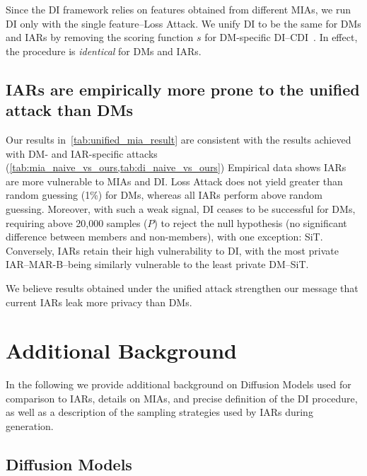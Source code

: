 {Since the DI framework relies on features obtained from different MIAs, we run DI only with the single feature--Loss Attack. We unify DI to be the same for DMs and IARs by removing the scoring function $s$ for DM-specific DI--CDI~\citep{dubinski2024cdicopyrighteddataidentification}. In effect, the procedure is \textit{identical} for DMs and IARs.}

\subsection{IARs are empirically more prone to the unified attack than DMs}

{Our results in~\cref{tab:unified_mia_result} are consistent with the results achieved with DM- and IAR-specific attacks (\cref{tab:mia_naive_vs_ours,tab:di_naive_vs_ours}) Empirical data shows IARs are more vulnerable to MIAs and DI. Loss Attack does not yield \tprat greater than random guessing (1\%) for DMs, whereas all IARs perform above random guessing. Moreover, with such a weak signal, DI ceases to be successful for DMs, requiring above 20,000 samples ($P$) to reject the null hypothesis (no significant difference between members and non-members), with one exception: SiT. Conversely, IARs retain their high vulnerability to DI, with the most private IAR--MAR-B--being similarly vulnerable to the least private DM--SiT.}

{We believe results obtained under the unified attack strengthen our message that current IARs leak more privacy than DMs.}

\section{Additional Background}

{In the following we provide additional background on Diffusion Models used for comparison to IARs, details on MIAs, and precise definition of the DI procedure, as well as a description of the sampling strategies used by IARs during generation.}

\subsection{Diffusion Models}
\label{app:dms_full}

